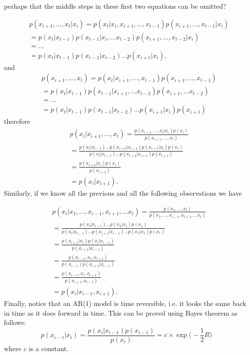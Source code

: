 {\color{red} perhaps that the middle steps in these first two equations can be omitted?}

\begin{align*}
    &p(x_{i+1}, \dots, x_t | x_i) = p(x_t | x_i, x_{i+1}, \dots, x_{t-1}) p(x_{i+1}, \dots, x_{t-1} | x_i)\\
    &= p(x_t | x_{t-1}) p(x_{t-1} | x_i, \dots x_{t-2}) p(x_{i+1}, \dots, x_{t-2} | x_i)\\
    &= \dots\\
    &= p(x_t | x_{t-1})p(x_{t-1} | x_{t-2}) \dots p(x_{i+1} | x_i),
\end{align*}
and
\begin{align*}
    &p(x_{i+1}, \dots, x_t) = p(x_t | x_{i+1}, \dots, x_{t-1}) p(x_{i+1}, \dots, x_{t-1})\\
    &= p(x_t | x_{t-1}) p(x_{t-1} | x_{i+1}, \dots x_{t-2}) p(x_{i+1}, \dots x_{t-2})\\
    &= \dots\\
    &= p(x_t | x_{t-1})p(x_{t-1} | x_{t-2}) \dots p(x_{i+1} | x_i) p(x_{i+1})
\end{align*}
therefore
\begin{align*}
    &p(x_i | x_{i+1}, \dots, x_t) = \frac{p(x_{i+1},\dots, x_t | x_i) p(x_i)}{p(x_{i+1}, \dots, x_t)}\\
    &= \frac{p(x_t | x_{t-1})\dots p(x_{i+2} | x_{i+1}) p(x_{i+1} | x_i) p(x_i)}{p(x_t | x_{t-1})\dots p(x_{i+2} | x_{i+1}) p(x_{i+1})}\\
    &= \frac{p(x_{i+1} | x_i) p(x_i)}{p(x_{i+1})}\\
    &= p(x_i | x_{i+1}).
\end{align*}
Similarly, if we know all the previous and all the following observations we have

\begin{align*}
    &p(x_i | x_1, \dots, x_{i-1}, x_{i+1}, \dots x_t) = \frac{p(x_1,\dots, x_t)}{p(x_1, \dots, x_{i-1}, x_{i+1}, \dots x_t)}\\
    &= \frac{p(x_t | x_{t-1})\dots p(x_2 | x_1) p(x_1)}{p(x_t | x_{t-1})\dots p(x_{i+1} | x_{i-1}) \dots p(x_2 | x_1) p(x_1)}\\
    &= \frac{p(x_{i+1} | x_i) p(x_i | x_{i-1})}{p(x_{i+1} | x_{i-1})}\\
    &= \frac{p(x_{i-1}, x_i, x_{i+1})}{p(x_{i-1}) p(x_{i+1} | x_{i-1})}\\
    &= \frac{p(x_{i-1}, x_i, x_{i+1})}{p(x_{i+1}, x_{i-1})}\\
    &= p(x_i | x_{i-1}, x_{i+1}).
\end{align*}
Finally, notice that an AR(1) model is time reversible, i.e. it looks the same back in time as it does forward in time.
This can be proved using Bayes theorem as follows:
\begin{equation*}
    p(x_{i-1} | x_i) = \frac{p(x_i | x_{i-1}) p(x_{i-1})}{p(x_i)} = c\times \exp\Big(-\frac{1}{2} R\Big)
\end{equation*}
where $c$ is a constant.


